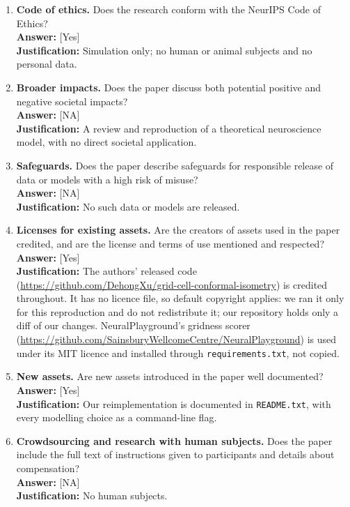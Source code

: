 \documentclass[10pt,letterpaper]{article}
\begin{document}
\begin{enumerate}
\item \textbf{Code of ethics.} Does the research conform with the NeurIPS Code of Ethics?\\
\textbf{Answer:} [Yes]\\
\textbf{Justification:} Simulation only; no human or animal subjects and no personal data.
 
\item \textbf{Broader impacts.} Does the paper discuss both potential positive and negative societal impacts?\\
\textbf{Answer:} [NA]\\
\textbf{Justification:} A review and reproduction of a theoretical neuroscience model, with no direct societal application.
 
\item \textbf{Safeguards.} Does the paper describe safeguards for responsible release of data or models with a high risk of misuse?\\
\textbf{Answer:} [NA]\\
\textbf{Justification:} No such data or models are released.
 
\item \textbf{Licenses for existing assets.} Are the creators of assets used in the paper credited, and are the license and terms of use mentioned and respected?\\
\textbf{Answer:} [Yes]\\
\textbf{Justification:} The authors' released code (\url{https://github.com/DehongXu/grid-cell-conformal-isometry}) is credited throughout. It has no licence file, so default copyright applies: we ran it only for this reproduction and do not redistribute it; our repository holds only a diff of our changes. NeuralPlayground's gridness scorer (\url{https://github.com/SainsburyWellcomeCentre/NeuralPlayground}) is used under its MIT licence and installed through \texttt{requirements.txt}, not copied.
 
\item \textbf{New assets.} Are new assets introduced in the paper well documented?\\
\textbf{Answer:} [Yes]\\
\textbf{Justification:} Our reimplementation is documented in \texttt{README.txt}, with every modelling choice as a command-line flag.
 
\item \textbf{Crowdsourcing and research with human subjects.} Does the paper include the full text of instructions given to participants and details about compensation?\\
\textbf{Answer:} [NA]\\
\textbf{Justification:} No human subjects.
 

\end{enumerate}
\end{document}
